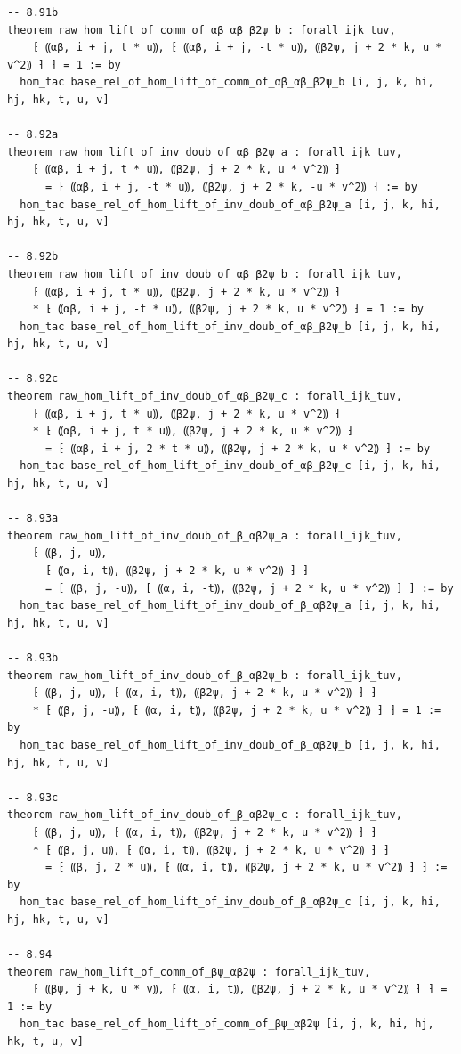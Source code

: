 \begin{Verbatim}
-- 8.91b
theorem raw_hom_lift_of_comm_of_αβ_αβ_β2ψ_b : forall_ijk_tuv,
    ⁅ ⸨αβ, i + j, t * u⸩, ⁅ ⸨αβ, i + j, -t * u⸩, ⸨β2ψ, j + 2 * k, u * v^2⸩ ⁆ ⁆ = 1 := by
  hom_tac base_rel_of_hom_lift_of_comm_of_αβ_αβ_β2ψ_b [i, j, k, hi, hj, hk, t, u, v]

-- 8.92a
theorem raw_hom_lift_of_inv_doub_of_αβ_β2ψ_a : forall_ijk_tuv,
    ⁅ ⸨αβ, i + j, t * u⸩, ⸨β2ψ, j + 2 * k, u * v^2⸩ ⁆
      = ⁅ ⸨αβ, i + j, -t * u⸩, ⸨β2ψ, j + 2 * k, -u * v^2⸩ ⁆ := by
  hom_tac base_rel_of_hom_lift_of_inv_doub_of_αβ_β2ψ_a [i, j, k, hi, hj, hk, t, u, v]

-- 8.92b
theorem raw_hom_lift_of_inv_doub_of_αβ_β2ψ_b : forall_ijk_tuv,
    ⁅ ⸨αβ, i + j, t * u⸩, ⸨β2ψ, j + 2 * k, u * v^2⸩ ⁆
    * ⁅ ⸨αβ, i + j, -t * u⸩, ⸨β2ψ, j + 2 * k, u * v^2⸩ ⁆ = 1 := by
  hom_tac base_rel_of_hom_lift_of_inv_doub_of_αβ_β2ψ_b [i, j, k, hi, hj, hk, t, u, v]

-- 8.92c
theorem raw_hom_lift_of_inv_doub_of_αβ_β2ψ_c : forall_ijk_tuv,
    ⁅ ⸨αβ, i + j, t * u⸩, ⸨β2ψ, j + 2 * k, u * v^2⸩ ⁆
    * ⁅ ⸨αβ, i + j, t * u⸩, ⸨β2ψ, j + 2 * k, u * v^2⸩ ⁆
      = ⁅ ⸨αβ, i + j, 2 * t * u⸩, ⸨β2ψ, j + 2 * k, u * v^2⸩ ⁆ := by
  hom_tac base_rel_of_hom_lift_of_inv_doub_of_αβ_β2ψ_c [i, j, k, hi, hj, hk, t, u, v]

-- 8.93a
theorem raw_hom_lift_of_inv_doub_of_β_αβ2ψ_a : forall_ijk_tuv,
    ⁅ ⸨β, j, u⸩,
      ⁅ ⸨α, i, t⸩, ⸨β2ψ, j + 2 * k, u * v^2⸩ ⁆ ⁆
      = ⁅ ⸨β, j, -u⸩, ⁅ ⸨α, i, -t⸩, ⸨β2ψ, j + 2 * k, u * v^2⸩ ⁆ ⁆ := by
  hom_tac base_rel_of_hom_lift_of_inv_doub_of_β_αβ2ψ_a [i, j, k, hi, hj, hk, t, u, v]

-- 8.93b
theorem raw_hom_lift_of_inv_doub_of_β_αβ2ψ_b : forall_ijk_tuv,
    ⁅ ⸨β, j, u⸩, ⁅ ⸨α, i, t⸩, ⸨β2ψ, j + 2 * k, u * v^2⸩ ⁆ ⁆
    * ⁅ ⸨β, j, -u⸩, ⁅ ⸨α, i, t⸩, ⸨β2ψ, j + 2 * k, u * v^2⸩ ⁆ ⁆ = 1 := by
  hom_tac base_rel_of_hom_lift_of_inv_doub_of_β_αβ2ψ_b [i, j, k, hi, hj, hk, t, u, v]

-- 8.93c
theorem raw_hom_lift_of_inv_doub_of_β_αβ2ψ_c : forall_ijk_tuv,
    ⁅ ⸨β, j, u⸩, ⁅ ⸨α, i, t⸩, ⸨β2ψ, j + 2 * k, u * v^2⸩ ⁆ ⁆
    * ⁅ ⸨β, j, u⸩, ⁅ ⸨α, i, t⸩, ⸨β2ψ, j + 2 * k, u * v^2⸩ ⁆ ⁆
      = ⁅ ⸨β, j, 2 * u⸩, ⁅ ⸨α, i, t⸩, ⸨β2ψ, j + 2 * k, u * v^2⸩ ⁆ ⁆ := by
  hom_tac base_rel_of_hom_lift_of_inv_doub_of_β_αβ2ψ_c [i, j, k, hi, hj, hk, t, u, v]

-- 8.94
theorem raw_hom_lift_of_comm_of_βψ_αβ2ψ : forall_ijk_tuv,
    ⁅ ⸨βψ, j + k, u * v⸩, ⁅ ⸨α, i, t⸩, ⸨β2ψ, j + 2 * k, u * v^2⸩ ⁆ ⁆ = 1 := by
  hom_tac base_rel_of_hom_lift_of_comm_of_βψ_αβ2ψ [i, j, k, hi, hj, hk, t, u, v]


\end{Verbatim}
